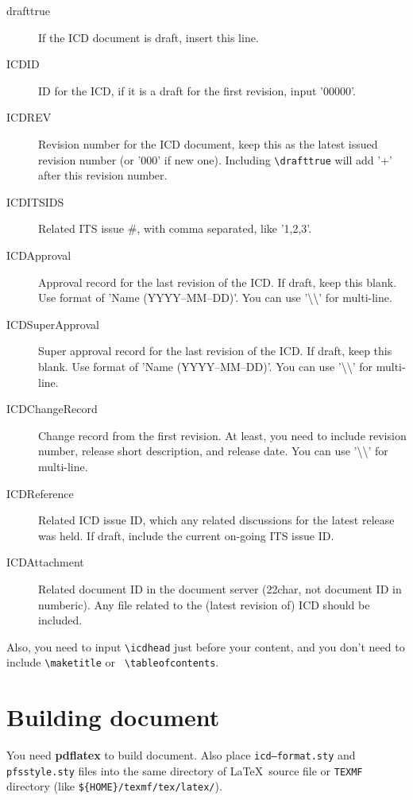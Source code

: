 \documentclass[a4paper,notitlepage]{article}
\begin{document}
\begin{description}
  \item[drafttrue] If the ICD document is draft, insert this line. 
  \item[ICDID] ID for the ICD, if it is a draft for the first revision, input 
    '00000'.
  \item[ICDREV] Revision number for the ICD document, keep this as the latest 
    issued revision number (or '000' if new one). 
    Including {\tt \textbackslash drafttrue} will add '+' after this revision number.
  \item[ICDITSIDS] Related ITS issue \#, with comma separated, like 
    '1,2,3'.
  \item[ICDApproval] Approval record for the last revision of the ICD.
    If draft, keep this blank. Use format of 'Name (YYYY--MM--DD)'. 
    You can use '\textbackslash\textbackslash' for multi-line.
  \item[ICDSuperApproval] Super approval record for the last revision of the 
    ICD.
    If draft, keep this blank. Use format of 'Name (YYYY--MM--DD)'. 
    You can use '\textbackslash\textbackslash' for multi-line.
  \item[ICDChangeRecord] Change record from the first revision. At least, you 
    need to include revision number, release short description, and release 
    date. 
    You can use '\textbackslash\textbackslash' for multi-line.
  \item[ICDReference] Related ICD issue ID, which any related discussions for 
    the latest release was held. 
    If draft, include the current on-going ITS issue ID. 
  \item[ICDAttachment] Related document ID in the document server (22char, 
    not document ID in numberic). 
    Any file related to the (latest revision of) ICD should be included. 
\end{description}

Also, you need to input {\tt \textbackslash icdhead} just before your content, 
and you don't need to include {\tt \textbackslash maketitle} or {\tt 
\textbackslash tableofcontents}. 


\section{Building document}

You need {\bf pdflatex} to build document. 
Also place {\tt icd--format.sty} and {\tt pfsstyle.sty} files into the same 
directory of \LaTeX\ source file or {\tt TEXMF} directory 
(like {\tt \$\{HOME\}/texmf/tex/latex/}). 
\end{document}
